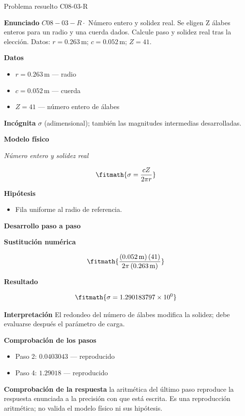 \documentclass[10pt,openany]{book}
\begin{document}
\begin{studiumworked}{Problema resuelto C08-03-R}


\noindent\textbf{Enunciado}
\(C08-03-R \cdot\) Número entero y solidez real. Se eligen Z álabes enteros para un radio y una cuerda dados. Calcule paso y solidez real tras la elección. Datos: \(r=0.263\, \mathrm{m}\); \(c=0.052\, \mathrm{m}\); \(Z=41\).

\noindent\textbf{Datos}
\begin{itemize}
\item $r = 0.263\,\mathrm{m}$ — radio
\item $c = 0.052\,\mathrm{m}$ — cuerda
\item $Z = 41$ — número entero de álabes
\end{itemize}

\noindent\textbf{Incógnita}
$\sigma$ (adimensional); también las magnitudes intermedias desarrolladas.

\noindent\textbf{Modelo físico}

\noindent\textit{Número entero y solidez real}

\[
\fitmath{\sigma=\frac{c Z}{2 \pi r}}
\]

\noindent\textbf{Hipótesis}
\begin{itemize}
\item Fila uniforme al radio de referencia.
\end{itemize}

\noindent\textbf{Desarrollo paso a paso}



\noindent\textbf{Sustitución numérica}

\[
\fitmath{\frac{\left(0.052\,\mathrm{m}\right) \left(41\right)}{2 \pi \left(0.263\,\mathrm{m}\right)}}
\]

\noindent\textbf{Resultado}

\[
\fitmath{\sigma=1.290183797\times10^{0}}
\]

\noindent\textbf{Interpretación}
El redondeo del número de álabes modifica la solidez; debe evaluarse después el parámetro de carga.

\noindent\textbf{Comprobación de los pasos}
\begin{itemize}
\item Paso 2: $0.0403043$ — reproducido
\item Paso 4: $1.29018$ — reproducido
\end{itemize}

\noindent\textbf{Comprobación de la respuesta} la aritmética del último paso reproduce la respuesta enunciada a la precisión con que está escrita. Es una reproducción aritmética; no valida el modelo físico ni sus hipótesis.


\end{studiumworked}
\end{document}
